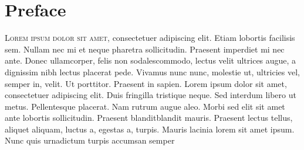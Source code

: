 \chapter{Preface}

\lettrine{L}{orem ipsum dolor sit amet}, consectetuer adipiscing elit. Etiam lobortis facilisis sem. Nullam nec mi et neque pharetra sollicitudin. Praesent imperdiet mi nec ante.  Donec ullamcorper, felis non sodalescommodo, lectus velit ultrices augue, a dignissim nibh lectus placerat pede. Vivamus nunc nunc, molestie ut, ultricies vel, semper in, velit. Ut porttitor. Praesent in sapien. Lorem ipsum dolor sit amet, consectetuer adipiscing elit. Duis fringilla tristique neque. Sed interdum libero ut metus. Pellentesque placerat. Nam rutrum augue aleo. Morbi sed elit sit amet ante lobortis sollicitudin. Praesent blanditblandit mauris. Praesent lectus tellus, aliquet aliquam, luctus a, egestas a, turpis. Mauris lacinia lorem sit amet ipsum. Nunc quis urnadictum turpis accumsan semper
